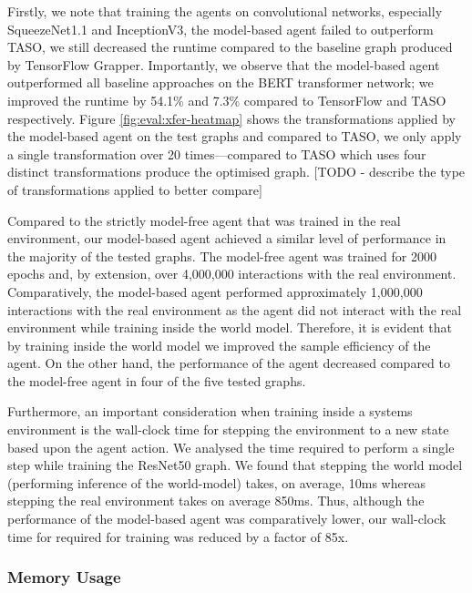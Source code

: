 Firstly, we note that training the agents on convolutional networks, especially SqueezeNet1.1 and InceptionV3, the model-based agent failed to outperform TASO, we still decreased the runtime compared to the baseline graph produced by TensorFlow Grapper. Importantly, we observe that the model-based agent outperformed all baseline approaches on the BERT transformer network; we improved the runtime by 54.1\% and 7.3\% compared to TensorFlow and TASO respectively. Figure \ref{fig:eval:xfer-heatmap} shows the transformations applied by the model-based agent on the test graphs and compared to TASO, we only apply a single transformation over 20 times---compared to TASO which uses four distinct transformations produce the optimised graph. [TODO - describe the type of transformations applied to better compare]

Compared to the strictly model-free agent that was trained in the real environment, our model-based agent achieved a similar level of performance in the majority of the tested graphs. The model-free agent was trained for 2000 epochs and, by extension, over 4,000,000 interactions with the real environment. Comparatively, the model-based agent performed approximately 1,000,000 interactions with the real environment as the agent did not interact with the real environment while training inside the world model. Therefore, it is evident that by training inside the world model we improved the sample efficiency of the agent. On the other hand, the performance of the agent decreased compared to the model-free agent in four of the five tested graphs.

Furthermore, an important consideration when training inside a systems environment is the wall-clock time for stepping the environment to a new state based upon the agent action. We analysed the time required to perform a single step while training the ResNet50 graph. We found that stepping the world model (performing inference of the world-model) takes, on average, 10ms whereas stepping the real environment takes on average 850ms. Thus, although the performance of the model-based agent was comparatively lower, our wall-clock time for required for training was reduced by a factor of 85x.

\subsubsection{Memory Usage}


